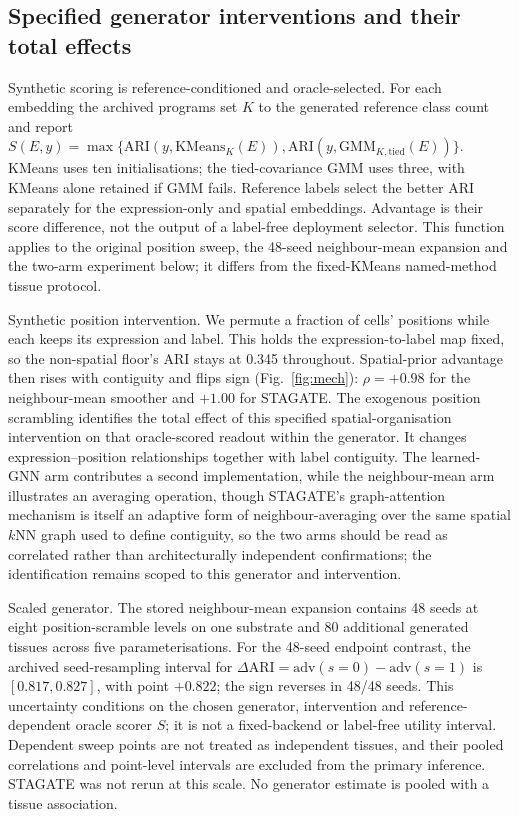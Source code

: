 \documentclass[11pt]{article}
\begin{document}
\subsection{Specified generator interventions and their total effects}\label{sec:causal}


Synthetic scoring is reference-conditioned and oracle-selected. For each embedding the archived programs set $K$ to the generated reference class count and report $S(E,y)=\max\{\mathrm{ARI}(y,\mathrm{KMeans}_K(E)),\mathrm{ARI}(y,\mathrm{GMM}_{K,\mathrm{tied}}(E))\}$. KMeans uses ten initialisations; the tied-covariance GMM uses three, with KMeans alone retained if GMM fails. Reference labels select the better ARI separately for the expression-only and spatial embeddings. Advantage is their score difference, not the output of a label-free deployment selector. This function applies to the original position sweep, the 48-seed neighbour-mean expansion and the two-arm experiment below; it differs from the fixed-KMeans named-method tissue protocol.

Synthetic position intervention. We permute a fraction of cells'
positions while each keeps its expression and label. This holds the expression-to-label map fixed, so the
non-spatial floor's ARI stays at 0.345 throughout. Spatial-prior advantage then rises with contiguity and
flips sign (Fig.~\ref{fig:mech}): $\rho=+0.98$ for the neighbour-mean smoother and $+1.00$ for STAGATE.
The exogenous position scrambling identifies the total effect of this specified spatial-organisation intervention on that oracle-scored readout within the generator. It changes expression--position relationships together with label contiguity. The learned-GNN arm contributes a second implementation, while the neighbour-mean arm
illustrates an averaging operation, though STAGATE's graph-attention mechanism is itself an adaptive form of
neighbour-averaging over the same spatial $k$NN graph used to define contiguity, so the two arms should be
read as correlated rather than architecturally independent confirmations; the identification remains scoped to this generator and intervention.



Scaled generator. The stored neighbour-mean expansion contains 48 seeds at eight position-scramble levels on one substrate and 80 additional generated tissues across five parameterisations. For the 48-seed endpoint contrast, the archived seed-resampling interval for $\Delta\mathrm{ARI}=\mathrm{adv}(s=0)-\mathrm{adv}(s=1)$ is $[0.817,0.827]$, with point $+0.822$; the sign reverses in 48/48 seeds. This uncertainty conditions on the chosen generator, intervention and reference-dependent oracle scorer $S$; it is not a fixed-backend or label-free utility interval. Dependent sweep points are not treated as independent tissues, and their pooled correlations and point-level intervals are excluded from the primary inference. STAGATE was not rerun at this scale. No generator estimate is pooled with a tissue association.
\end{document}
